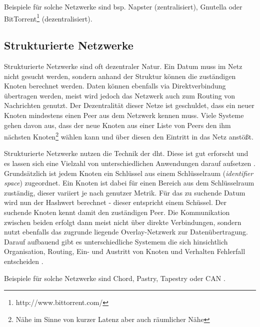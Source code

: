 Beispiele für solche Netzwerke sind bsp. Napster (zentralisiert), Gnutella oder BitTorrent\footnote{http://www.bittorrent.com/} (dezentralisiert).

\subsection{Strukturierte Netzwerke}
Strukturierte Netzwerke sind oft dezentraler Natur. Ein Datum muss im Netz nicht gesucht werden,  sondern anhand der Struktur können die zuständigen Knoten berechnet werden. Daten können ebenfalls via Direktverbindung übertragen werden, meist wird jedoch das Netzwerk auch zum Routing von Nachrichten genutzt. Der Dezentralität dieser Netze ist geschuldet, dass ein neuer Knoten mindestens einen Peer aus dem Netzwerk kennen muss. Viele Systeme gehen davon aus, dass der neue Knoten aus einer Liste von Peers den ihm nächsten Knoten\footnote{Nähe im Sinne von kurzer Latenz aber auch räumlicher Nähe} wählen kann und über diesen den Eintritt in das Netz anstößt.

Strukturierte Netzwerke nutzen die Technik der \ac{dht}. Diese ist gut erforscht und es lassen sich eine Vielzahl von unterschiedlichen Anwendungen darauf aufsetzen \cite{Wehrle2005, Ghodsi2006AlgorithmsDHT}.\\
Grundsätzlich ist jedem Knoten ein Schlüssel aus einem Schlüsselraum (\emph{identifier space}) zugeordnet. Ein Knoten ist dabei für einen Bereich aus dem Schlüsselraum zuständig, dieser variiert je nach genutzer Metrik. Für das zu suchende Datum wird nun der Hashwert berechnet - dieser entspricht einem Schüssel. Der suchende Knoten kennt damit den zuständigen Peer. Die Kommunikation zwischen beiden erfolgt dann meist nicht über direkte Verbindungen, sondern nutzt ebenfalls das zugrunde liegende Overlay-Netzwerk zur Datenübertragung.\\
Darauf aufbauend gibt es unterschiedliche Systemem die sich hinsichtlich Organisation, Routing, Ein- und Austritt von Knoten und Verhalten Fehlerfall entscheiden \cite{Goetz2005, Lua2005Survey}.

Beispiele für solche Netzwerke sind Chord, Pastry, Tapestry oder CAN \cite{Hosseini2007Survey, Rowstron2001, Zhao2001Tapestry,Zhao2004Tapestry, Ratnasamy2001Scalable}.








